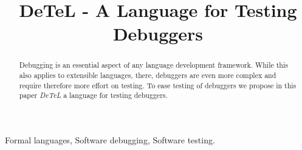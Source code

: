 \documentclass[conference]{template/IEEEtran} %
\begin{document}
\title{DeTeL - A Language for Testing Debuggers}  

\author{
\and
{}
\and
{}
\and
{}
}

\maketitle

\begin{abstract}
Debugging is an essential aspect of any language development framework. While
this also applies to extensible languages, there, debuggers are even more
complex and require therefore more effort on testing. 
To ease testing of debuggers we propose in this paper \emph{DeTeL} a language
for testing debuggers. 
\end{abstract}

\begin{IEEEkeywords}
Formal languages, Software debugging, Software testing.
\end{IEEEkeywords}













\end{document}
